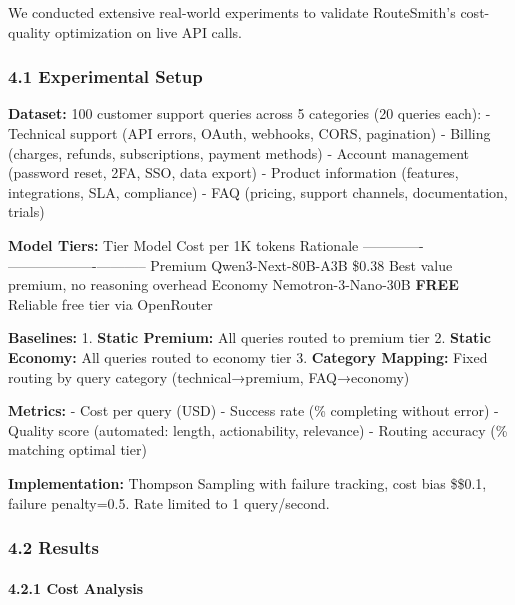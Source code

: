 \documentclass[
]{article}
\begin{document}
We conducted extensive real-world experiments to validate RouteSmith's
cost-quality optimization on live API calls.

\hypertarget{experimental-setup-1}{%
\subsubsection{4.1 Experimental Setup}\label{experimental-setup-1}}

\textbf{Dataset:} 100 customer support queries across 5 categories (20
queries each): - Technical support (API errors, OAuth, webhooks, CORS,
pagination) - Billing (charges, refunds, subscriptions, payment methods)
- Account management (password reset, 2FA, SSO, data export) - Product
information (features, integrations, SLA, compliance) - FAQ (pricing,
support channels, documentation, trials)

\textbf{Model Tiers:} \textbar{} Tier \textbar{} Model \textbar{} Cost
per 1K tokens \textbar{} Rationale \textbar{}
\textbar------\textbar-------\textbar-------------------\textbar-----------\textbar{}
\textbar{} Premium \textbar{} Qwen3-Next-80B-A3B \textbar{} \$0.38
\textbar{} Best value premium, no reasoning overhead \textbar{}
\textbar{} Economy \textbar{} Nemotron-3-Nano-30B \textbar{}
\textbf{FREE} \textbar{} Reliable free tier via OpenRouter \textbar{}

\textbf{Baselines:} 1. \textbf{Static Premium:} All queries routed to
premium tier 2. \textbf{Static Economy:} All queries routed to economy
tier 3. \textbf{Category Mapping:} Fixed routing by query category
(technical→premium, FAQ→economy)

\textbf{Metrics:} - Cost per query (USD) - Success rate (\% completing
without error) - Quality score (automated: length, actionability,
relevance) - Routing accuracy (\% matching optimal tier)

\textbf{Implementation:} Thompson Sampling with failure tracking, cost
bias \$\lambda\$0.1, failure penalty=0.5. Rate limited to 1
query/second.

\hypertarget{results-1}{%
\subsubsection{4.2 Results}\label{results-1}}

\hypertarget{cost-analysis-1}{%
\paragraph{4.2.1 Cost Analysis}\label{cost-analysis-1}}
\end{document}

